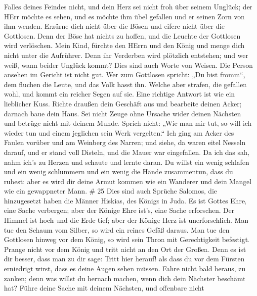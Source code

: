 Falles deines Feindes nicht, und dein Herz sei nicht froh über seinem
Unglück;  der HErr möchte es sehen, und es möchte ihm übel
gefallen und er seinen Zorn von ihm wenden.  Erzürne dich
nicht über die Bösen und eifere nicht über die Gottlosen. 
Denn der Böse hat nichts zu hoffen, und die Leuchte der Gottlosen wird
verlöschen.  Mein Kind, fürchte den HErrn und den König und
menge dich nicht unter die Aufrührer.  Denn ihr Verderben
wird plötzlich entstehen; und wer weiß, wann beider Unglück kommt?
 Dies sind auch Worte von Weisen. Die Person ansehen im
Gericht ist nicht gut.  Wer zum Gottlosen spricht: „Du bist
fromm``, dem fluchen die Leute, und das Volk hasst ihn. 
Welche aber strafen, die gefallen wohl, und kommt ein reicher Segen auf
sie.  Eine richtige Antwort ist wie ein lieblicher Kuss.
 Richte draußen dein Geschäft aus und bearbeite deinen
Acker; darnach baue dein Haus.  Sei nicht Zeuge ohne
Ursache wider deinen Nächsten und betrüge nicht mit deinem Munde.
 Sprich nicht: „Wie man mir tut, so will ich wieder tun und
einem jeglichen sein Werk vergelten.``  Ich ging am Acker
des Faulen vorüber und am Weinberg des Narren;  und siehe,
da waren eitel Nesseln darauf, und er stand voll Disteln, und die Mauer
war eingefallen.  Da ich das sah, nahm ich's zu Herzen und
schaute und lernte daran.  Du willst ein wenig schlafen und
ein wenig schlummern und ein wenig die Hände zusammentun, dass du
ruhest:  aber es wird dir deine Armut kommen wie ein
Wanderer und dein Mangel wie ein gewappneter Mann. \# 25 
Dies sind auch Sprüche Salomos, die hinzugesetzt haben die Männer
Hiskias, des Königs in Juda.  Es ist Gottes Ehre, eine Sache
verbergen; aber der Könige Ehre ist's, eine Sache erforschen.
 Der Himmel ist hoch und die Erde tief; aber der Könige Herz
ist unerforschlich.  Man tue den Schaum vom Silber, so wird
ein reines Gefäß daraus.  Man tue den Gottlosen hinweg vor
dem König, so wird sein Thron mit Gerechtigkeit befestigt. 
Prange nicht vor dem König und tritt nicht an den Ort der Großen.
 Denn es ist dir besser, dass man zu dir sage: Tritt hier
herauf! als dass du vor dem Fürsten erniedrigt wirst, dass es deine
Augen sehen müssen.  Fahre nicht bald heraus, zu zanken;
denn was willst du hernach machen, wenn dich dein Nächster beschämt hat?
 Führe deine Sache mit deinem Nächsten, und offenbare nicht
